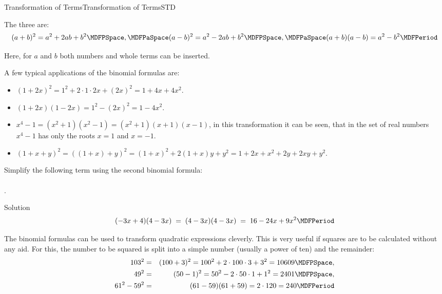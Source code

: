 \begin{MXContent}{Transformation of Terms}{Transformation of Terms}{STD}
\begin{MInfo}
The three  are:
$$ (a+b)^2 = a^2+2a b+b^2 \MDFPSpace, \MDFPaSpace (a-b)^2 = a^2-2a b+b^2 \MDFPSpace,\MDFPaSpace (a+b)(a-b) = a^2-b^2 \MDFPeriod $$
\end{MInfo}


Here, for $a$ and $b$ both numbers and whole terms can be inserted.

\begin{MExample}
A few typical applications of the binomial formulas are:
\begin{itemize}
\item{$(1+2x)^2=1^2+2\cdot1\cdot 2x+(2x)^2=1+4x+4x^2$.}
\item{$(1+2x)(1-2x)=1^2-(2x)^2=1-4x^2$.}
\item{$x^4-1=(x^2+1)(x^2-1)=(x^2+1)(x+1)(x-1)$, in this transformation it can be seen, that in the set 
of real numbers $x^4-1$ has only the roots $x=1$ and $x=-1$.}
\item{$(1+x+y)^2=\left({(1+x)+y}\right)^2= (1+x)^2+2(1+x)y+y^2=1+2x+x^2+2y+2x y+y^2$.}
\end{itemize}
\end{MExample}

\begin{MExercise}
Simplify the following term using the second binomial formula:\ \\ \ \\
.

\begin{MHint}{Solution}$$(-3x+4)(4-3x)\;=\; (4-3x)(4-3x)\;=\; 16-24x+9x^2 \MDFPeriod $$\end{MHint}
\end{MExercise}

\begin{MExample}%
The binomial formulas can be used to transform quadratic expressions cleverly.
This is very useful if squares are to be calculated without any aid. For this, the number to be 
squared is split into a simple number (usually a power of ten) and the remainder:
\begin{eqnarray*}
103^2 & = & (100+3)^2 = 100^2+2\cdot 100\cdot 3+3^2 = 10609 \MDFPSpace,\\
49^2 & = & (50-1)^2 = 50^2-2\cdot 50\cdot 1 +1^2 = 2401 \MDFPSpace,\\
61^2-59^2 & = & (61-59)(61+59) = 2\cdot 120 = 240 \MDFPeriod
\end{eqnarray*}
\end{MExample}


\end{MXContent}
